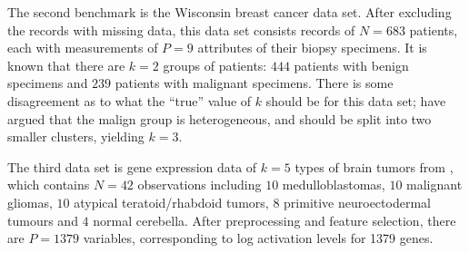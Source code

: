 \documentclass[12pt]{article}
\begin{document}
The second benchmark is the \citet{mangasarian1990pattern} Wisconsin breast
cancer data set.  After excluding the records with missing data, this data set
consists records of $N = 683$ patients, each with measurements of $P = 9$
attributes of their biopsy specimens. It is known that there are $k = 2$
groups of patients: $444$ patients with benign specimens and $239$ patients
with malignant specimens. There is some disagreement as to what the ``true''
value of $k$ should be for this data set; \citet{fujita2014non} have argued
that the malign group is heterogeneous, and should be split into two smaller
clusters, yielding $k = 3$.


The third data set is gene expression data of $k = 5$ types of brain tumors
from \citet{pomeroy2002prediction}, which contains $N = 42$ observations
including $10$ medulloblastomas, $10$ malignant gliomas, $10$ atypical
teratoid/rhabdoid tumors, $8$ primitive neuroectodermal tumours and $4$ normal
cerebella. After preprocessing and feature selection, there are $P = 1379$
variables, corresponding to log activation levels for 1379 genes.




\end{document}
